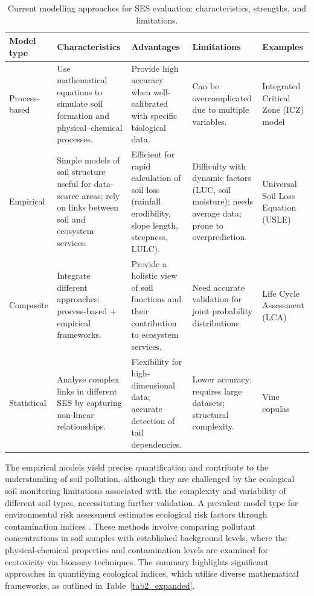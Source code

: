 \documentclass[preprint,12pt]{elsarticle}            %
\begin{document}
\begin{table}[htbp]
\caption{Current modelling approaches for SES evaluation: characteristics,
    strengths, and limitations.}\label{tab3}
\begin{tabularx}{\textwidth}{@{} p{2.0cm} p{3.5cm} p{3.5cm} p{3.0cm} X @{}}
\toprule
\textbf{Model type} & \textbf{Characteristics} & \textbf{Advantages}
    & \textbf{Limitations} & \textbf{Examples} \\
\midrule
Process-based
    & Use mathematical equations to simulate soil formation and
      physical--chemical processes.
    & Provide high accuracy when well-calibrated with specific biological
      data.
    & Can be overcomplicated due to multiple variables.
    & Integrated Critical Zone (ICZ) model \cite{Giannakis2017} \\[6pt]
Empirical
    & Simple models of soil structure useful for data-scarce areas; rely on
      links between soil and ecosystem services.
    & Efficient for rapid calculation of soil loss (rainfall erodibility,
      slope length, steepness, LULC).
    & Difficulty with dynamic factors (LUC, soil moisture); needs average
      data; prone to overprediction.
    & Universal Soil Loss Equation (USLE) \cite{Benavidez2018} \\[6pt]
Composite
    & Integrate different approaches: process-based $+$ empirical
      frameworks.
    & Provide a holistic view of soil functions and their contribution to
      ecosystem services.
    & Need accurate validation for joint probability distributions.
    & Life Cycle Assessment (LCA) \cite{Sadhukhan2022} \\[6pt]
Statistical
    & Analyse complex links in different SES by capturing non-linear
      relationships.
    & Flexibility for high-dimensional data; accurate detection of tail
      dependencies.
    & Lower accuracy; requires large datasets; structural complexity.
    & Vine copulas \cite{Luetal2020} \\
\bottomrule
\end{tabularx}
\end{table}

The empirical models yield precise quantification and contribute to the
understanding of soil pollution, although they are challenged by the
ecological soil monitoring limitations associated with the complexity and
variability of different soil types, necessitating further validation. A
prevalent model type for environmental risk assessment estimates ecological
risk factors through contamination indices
\cite{Stojic2019,Mohammad2025,Sun2025,Edo2024,Chon2011,Ferreira2022}. These
methods involve comparing pollutant concentrations in soil samples with
established background levels, where the physical-chemical properties and
contamination levels are examined for ecotoxicity via bioassay techniques. The
summary highlights significant approaches in quantifying ecological indices,
which utilise diverse mathematical frameworks, as outlined in
Table~\ref{tab2_expanded}.
\end{document}
